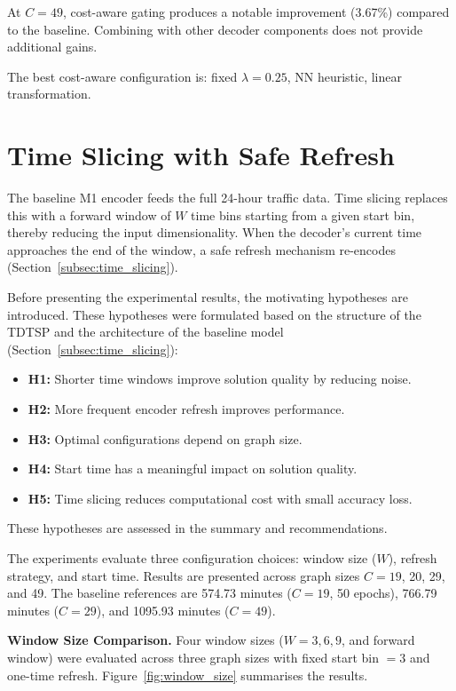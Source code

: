 At $C = 49$, cost-aware gating produces a notable improvement (3.67\%) compared to the
baseline. Combining with other decoder components does not provide additional gains.

The best cost-aware configuration is: fixed $\lambda = 0.25$, NN heuristic, linear
transformation.

\section{Time Slicing with Safe Refresh}
\label{sec:time_slicing_exp}

The baseline M1 encoder feeds the full 24-hour traffic data. Time slicing replaces this with
a forward window of $W$ time bins starting from a given start bin, thereby reducing the input
dimensionality. When the decoder's current time approaches the end of the window, a safe
refresh mechanism re-encodes (Section~\ref{subsec:time_slicing}).

Before presenting the experimental results, the motivating hypotheses are introduced. These
hypotheses were formulated based on the structure of the TDTSP and the architecture of the
baseline model (Section~\ref{subsec:time_slicing}):

\begin{itemize}
    \item \textbf{H1:} Shorter time windows improve solution quality by reducing noise.
    \item \textbf{H2:} More frequent encoder refresh improves performance.
    \item \textbf{H3:} Optimal configurations depend on graph size.
    \item \textbf{H4:} Start time has a meaningful impact on solution quality.
    \item \textbf{H5:} Time slicing reduces computational cost with small accuracy loss.
\end{itemize}

These hypotheses are assessed in the summary and recommendations.

The experiments evaluate three configuration choices: window size ($W$), refresh strategy,
and start time. Results are presented across graph sizes $C = 19$, 20, 29, and 49. The
baseline references are 574.73 minutes ($C = 19$, 50 epochs), 766.79 minutes ($C = 29$),
and 1095.93 minutes ($C = 49$).

\textbf{Window Size Comparison.} Four window sizes ($W = 3, 6, 9$, and forward window) were evaluated across three graph
sizes with fixed start bin $= 3$ and one-time refresh. Figure~\ref{fig:window_size}
summarises the results.

